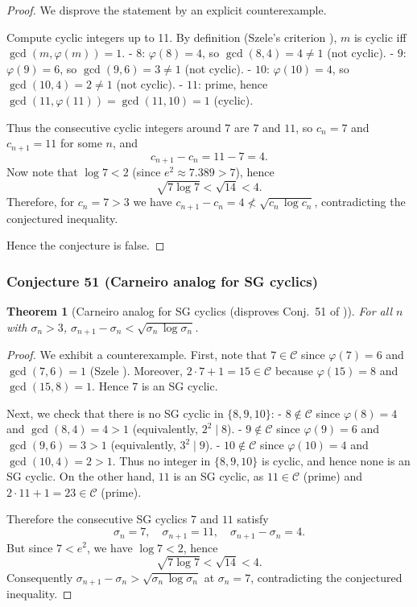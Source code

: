 \documentclass[12pt]{article}
\newtheorem{theorem}{Theorem}
\theoremstyle{remark}
\begin{document}
\begin{proof}
We disprove the statement by an explicit counterexample.

Compute cyclic integers up to 11. By definition (Szele's criterion \cite{Szele1947}), $m$ is cyclic iff $\gcd(m,\varphi(m))=1$.
- $8$: $\varphi(8)=4$, so $\gcd(8,4)=4\ne1$ (not cyclic).
- $9$: $\varphi(9)=6$, so $\gcd(9,6)=3\ne1$ (not cyclic).
- $10$: $\varphi(10)=4$, so $\gcd(10,4)=2\ne1$ (not cyclic).
- $11$: prime, hence $\gcd(11,\varphi(11))=\gcd(11,10)=1$ (cyclic).

Thus the consecutive cyclic integers around $7$ are $7$ and $11$, so $c_{n}=7$ and $c_{n+1}=11$ for some $n$, and
$$
 c_{n+1}-c_n=11-7=4.
$$
Now note that $\log 7<2$ (since $e^2\approx7.389>7$), hence
$$
 \sqrt{7\log 7}<\sqrt{14}<4.
$$
Therefore, for $c_n=7>3$ we have $c_{n+1}-c_n=4\not<\sqrt{c_n\,\log c_n}$, contradicting the conjectured inequality.

Hence the conjecture is false. 
\end{proof}



\subsubsection{Conjecture 51 (Carneiro analog for SG cyclics)}
\begin{theorem}[Carneiro analog for SG cyclics (disproves Conj.~51 of \cite{Cohen2025})]\label{thm:carneiro_sg_cyclics}
For all $n$ with $\sigma_n>3$, $\sigma_{n+1}-\sigma_n<\sqrt{\sigma_n\,\log \sigma_n}$.
\end{theorem}

\begin{proof}
We exhibit a counterexample. First, note that $7\in\mathcal{C}$ since $\varphi(7)=6$ and $\gcd(7,6)=1$ (Szele \cite{Szele1947}). Moreover, $2\cdot 7+1=15\in\mathcal{C}$ because $\varphi(15)=8$ and $\gcd(15,8)=1$. Hence $7$ is an SG cyclic.

Next, we check that there is no SG cyclic in $\{8,9,10\}$:
- $8\notin\mathcal{C}$ since $\varphi(8)=4$ and $\gcd(8,4)=4>1$ (equivalently, $2^2\mid 8$).
- $9\notin\mathcal{C}$ since $\varphi(9)=6$ and $\gcd(9,6)=3>1$ (equivalently, $3^2\mid 9$).
- $10\notin\mathcal{C}$ since $\varphi(10)=4$ and $\gcd(10,4)=2>1$.
Thus no integer in $\{8,9,10\}$ is cyclic, and hence none is an SG cyclic. On the other hand, $11$ is an SG cyclic, as $11\in\mathcal{C}$ (prime) and $2\cdot 11+1=23\in\mathcal{C}$ (prime).

Therefore the consecutive SG cyclics $7$ and $11$ satisfy
$$\sigma_{n}=7,\quad \sigma_{n+1}=11,\quad \sigma_{n+1}-\sigma_n=4.$$
But since $7<e^2$, we have $\log 7<2$, hence
$$\sqrt{7\log 7}<\sqrt{14}<4.$$ 
Consequently $\sigma_{n+1}-\sigma_n>\sqrt{\sigma_n\,\log \sigma_n}$ at $\sigma_n=7$, contradicting the conjectured inequality. 
\end{proof}
\end{document}

